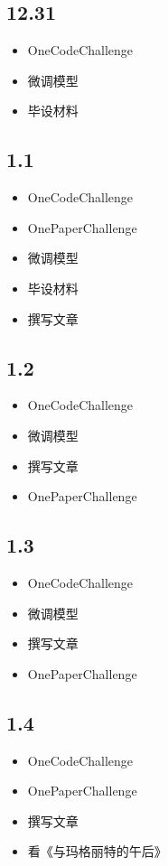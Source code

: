 \documentclass[UTF8]{ctexart}
\begin{document}
\subsection*{12.31}
\begin{itemize}
    \item OneCodeChallenge
    \item 微调模型
    \item 毕设材料
\end{itemize}

\subsection*{1.1}
\begin{itemize}
    \item OneCodeChallenge
    \item OnePaperChallenge
    \item 微调模型
    \item 毕设材料
    \item 撰写文章
\end{itemize}

\subsection*{1.2}
\begin{itemize}
    \item OneCodeChallenge
    \item 微调模型
    \item 撰写文章
    \item OnePaperChallenge
\end{itemize}

\subsection*{1.3}
\begin{itemize}
    \item OneCodeChallenge
    \item 微调模型
    \item 撰写文章
    \item OnePaperChallenge
\end{itemize}

\subsection*{1.4}
\begin{itemize}
    \item OneCodeChallenge
    \item OnePaperChallenge
    \item 撰写文章
    \item 看《与玛格丽特的午后》
\end{itemize}
\end{document}
